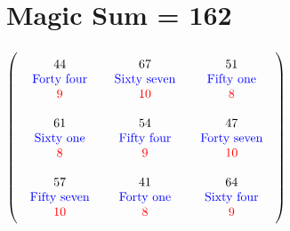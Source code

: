 \documentclass{article}
\begin{document}
\vspace{2em} 
\section{Magic Sum = 162}$ \left( \begin{array}{ccc}
\begin{array}{c}
\rule{0pt}{1.5em}44 \\ 
\text{\color{blue}Forty four} \\ 
\color{red}9 \vspace{.5em} 
\end{array} & \begin{array}{c}
\rule{0pt}{1.5em}67 \\ 
\text{\color{blue}Sixty seven} \\ 
\color{red}10 \vspace{.5em} 
\end{array} & \begin{array}{c}
\rule{0pt}{1.5em}51 \\ 
\text{\color{blue}Fifty one} \\ 
\color{red}8 \vspace{.5em} 
\end{array}\\ 
\begin{array}{c}
\rule{0pt}{1.5em}61 \\ 
\text{\color{blue}Sixty one} \\ 
\color{red}8 \vspace{.5em} 
\end{array} & \begin{array}{c}
\rule{0pt}{1.5em}54 \\ 
\text{\color{blue}Fifty four} \\ 
\color{red}9 \vspace{.5em} 
\end{array} & \begin{array}{c}
\rule{0pt}{1.5em}47 \\ 
\text{\color{blue}Forty seven} \\ 
\color{red}10 \vspace{.5em} 
\end{array}\\ 
\begin{array}{c}
\rule{0pt}{1.5em}57 \\ 
\text{\color{blue}Fifty seven} \\ 
\color{red}10 \vspace{.5em} 
\end{array} & \begin{array}{c}
\rule{0pt}{1.5em}41 \\ 
\text{\color{blue}Forty one} \\ 
\color{red}8 \vspace{.5em} 
\end{array} & \begin{array}{c}
\rule{0pt}{1.5em}64 \\ 
\text{\color{blue}Sixty four} \\ 
\color{red}9 \vspace{.5em} 
\end{array}\end{array} \right) $
\end{document}
